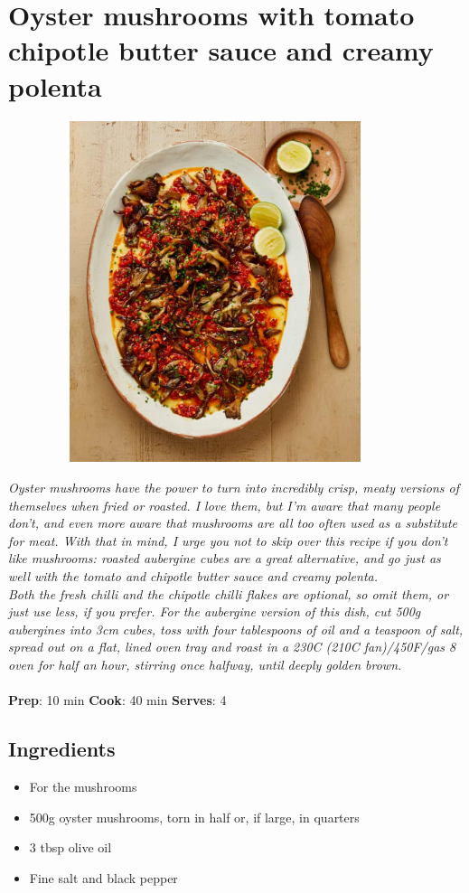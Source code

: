 \documentclass{book}
\begin{document}
\section{Oyster mushrooms with tomato chipotle butter sauce and creamy polenta}
\begin{figure}
\centering\includegraphics[width=10cm,height=10cm,keepaspectratio]{Recipe_Pictures/Oyster_mushrooms_with_tomato_chipotle_butter_sauce_and_creamy_polenta.png}
\end{figure}
\emph{Oyster mushrooms have the power to turn into incredibly crisp, meaty versions of themselves when fried or roasted. I love them, but I’m aware that many people don’t, and even more aware that mushrooms are all too often used as a substitute for meat. With that in mind, I urge you not to skip over this recipe if you don’t like mushrooms: roasted aubergine cubes are a great alternative, and go just as well with the tomato and chipotle butter sauce and creamy polenta.\\ 
Both the fresh chilli and the chipotle chilli flakes are optional, so omit them, or just use less, if you prefer. For the aubergine version of this dish, cut 500g aubergines into 3cm cubes, toss with four tablespoons of oil and a teaspoon of salt, spread out on a flat, lined oven tray and roast in a 230C (210C fan)/450F/gas 8 oven for half an hour, stirring once halfway, until deeply golden brown.}\\\\ 
\textbf{Prep}: 10 min
\textbf{Cook}: 40 min
\textbf{Serves}: 4
\subsection*{Ingredients}
\begin{itemize}
\item For the mushrooms
\item 500g oyster mushrooms, torn in half or, if large, in quarters
\item 3 tbsp olive oil
\item Fine salt and black pepper
\end{itemize}
\end{document}
